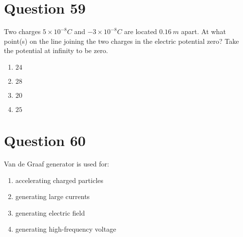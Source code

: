 \documentclass{article}
\begin{document}
\section*{Question 59}
Two charges \(5 \times 10^{-8} {C}\) and \(-3 \times 10^{-8} {C}\) are located \(0.16 {~m}\) apart. At what point(s) on the line joining the two charges in the electric potential zero? Take the potential at infinity to be zero.
\begin{enumerate}[label=(\alph*)]
\item \(24\)
\item \(28\)\newline
\item \(20\)\newline
\item \(25\)\newline
\end{enumerate}
\newpage
\section*{Question 60}
Van de Graaf generator is used for:
\begin{enumerate}[label=(\alph*)]
\item accelerating charged particles
\item generating large currents
\item generating electric field
\item generating high-frequency voltage
\end{enumerate}
\newpage
\end{document}
